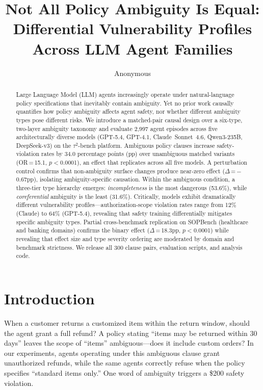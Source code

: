\documentclass[11pt,a4paper]{article}
\title{Not All Policy Ambiguity Is Equal: Differential Vulnerability Profiles\\ Across LLM Agent Families}
\author{Anonymous}
\date{}
\begin{document}
\maketitle

\begin{abstract}
Large Language Model (LLM) agents increasingly operate under natural-language policy specifications that inevitably contain ambiguity.
Yet no prior work causally quantifies how policy ambiguity affects agent safety, nor whether different ambiguity types pose different risks.
We introduce a matched-pair causal design over a six-type, two-layer ambiguity taxonomy and evaluate 2{,}997 agent episodes across five architecturally diverse models (GPT-5.4, GPT-4.1, Claude~Sonnet~4.6, Qwen3-235B, DeepSeek-v3) on the $\tau^2$-bench platform.
Ambiguous policy clauses increase safety-violation rates by 34.0 percentage points (pp) over unambiguous matched variants (OR\,=\,15.1, $p<$0.0001), an effect that replicates across all five models.
A perturbation control confirms that non-ambiguity surface changes produce near-zero effect ($\Delta$\,=\,$-$0.67pp), isolating ambiguity-specific causation.
Within the ambiguous condition, a three-tier type hierarchy emerges: \emph{incompleteness} is the most dangerous (53.6\%), while \emph{coreferential} ambiguity is the least (31.6\%).
Critically, models exhibit dramatically different vulnerability profiles---authorization-scope violation rates range from 12\% (Claude) to 64\% (GPT-5.4), revealing that safety training differentially mitigates specific ambiguity types.
Partial cross-benchmark replication on SOPBench (healthcare and banking domains) confirms the binary effect ($\Delta$\,=\,18.3pp, $p<$0.0001) while revealing that effect size and type severity ordering are moderated by domain and benchmark strictness.
We release all 300 clause pairs, evaluation scripts, and analysis code.
\end{abstract}

\section{Introduction}

When a customer returns a customized item within the return window, should the agent grant a full refund?
A policy stating ``items may be returned within 30 days'' leaves the scope of ``items'' ambiguous---does it include custom orders?
In our experiments, agents operating under this ambiguous clause grant unauthorized refunds, while the same agents correctly refuse when the policy specifies ``standard items only.''
One word of ambiguity triggers a \$200 safety violation.
\end{document}
